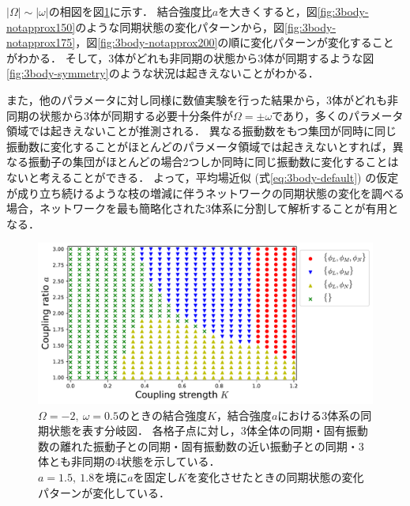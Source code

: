 \documentclass[../main]{subfiles}
\begin{document}
$|\Omega|\sim|\omega|$の相図を図\ref{fig:3body-phase-boundary}に示す．
結合強度比$a$を大きくすると，図\ref{fig:3body-notapprox150}のような同期状態の変化パターンから，図\ref{fig:3body-notapprox175}，図\ref{fig:3body-notapprox200}の順に変化パターンが変化することがわかる．
そして，3体がどれも非同期の状態から3体が同期するような図\ref{fig:3body-symmetry}のような状況は起きえないことがわかる．

また，他のパラメータに対し同様に数値実験を行った結果から，3体がどれも非同期の状態から3体が同期する必要十分条件が$\Omega=\pm\omega$であり，多くのパラメータ領域では起きえないことが推測される．
異なる振動数をもつ集団が同時に同じ振動数に変化することがほとんどのパラメータ領域では起きえないとすれば，異なる振動子の集団がほとんどの場合2つしか同時に同じ振動数に変化することはないと考えることができる．
よって，平均場近似 (式\eqref{eq:3body-default}) の仮定が成り立ち続けるような枝の増減に伴うネットワークの同期状態の変化を調べる場合，ネットワークを最も簡略化された3体系に分割して解析することが有用となる．

\begin{figure}[tbp]
\centering
\includegraphics[width=135mm]{./images/three-body-phase-boundary.pdf}
\centering
\caption{$\Omega=-2,\ \omega=0.5$のときの結合強度$K$，結合強度$a$における3体系の同期状態を表す分岐図．
各格子点に対し，3体全体の同期・固有振動数の離れた振動子との同期・固有振動数の近い振動子との同期・3体とも非同期の4状態を示している．\\
$a=1.5,\ 1.8$を境に$a$を固定し$K$を変化させたときの同期状態の変化パターンが変化している．}
\label{fig:3body-phase-boundary}
\end{figure}
\end{document}

